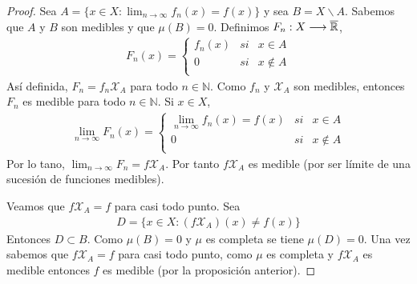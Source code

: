 \begin{proof}
    Sea $A = \{ x \in X : \lim_{n \to \infty}{f_n(x)} = f(x)\}$ y sea $B = X \backslash A$. Sabemos que $A$ y $B$ son medibles y que $\mu(B) = 0$. Definimos $F_n: X \longrightarrow \overline{\mathbb{R}}$,
    \begin{align*}
        F_n(x) = \left\{ \begin{array}{lcc}
                             f_n(x) & si & x \in A       \\
                             0      & si & x \not \in  A \\
                         \end{array}
        \right.
    \end{align*}
    Así definida, $F_n = f_n \mathcal{X}_A$ para todo $n \in \mathbb{N}$. Como $f_n$ y $\mathcal{X}_A$ son medibles, entonces $F_n$ es medible para todo $n \in \mathbb{N}$. Si $x \in X$,
    \begin{align*}
        \lim_{n \to \infty}{F_n(x)} = \left\{ \begin{array}{lcc}
                                                  \lim_{n \to \infty}{f_n(x)} = f(x) & si & x \in A       \\
                                                  0                                  & si & x \not \in  A \\
                                              \end{array}
        \right.
    \end{align*}
    Por lo tano, $\lim_{n \to \infty}{F_n} = f \mathcal{X}_A$. Por tanto $f \mathcal{X}_A$ es medible (por ser límite de una sucesión de funciones medibles).

    Veamos que $f \mathcal{X}_A = f$ para casi todo punto. Sea
    \begin{align*}
        D = \{ x \in X : (f \mathcal{X}_A)(x) \not = f(x) \}
    \end{align*}
    Entonces $D \subset B$. Como $\mu(B) = 0$ y $\mu$ es completa se tiene $\mu(D) = 0$. Una vez sabemos que $f \mathcal{X}_A = f$ para casi todo punto, como $\mu$ es completa y $f \mathcal{X}_A$ es medible entonces $f$ es medible (por la proposición anterior).
\end{proof}